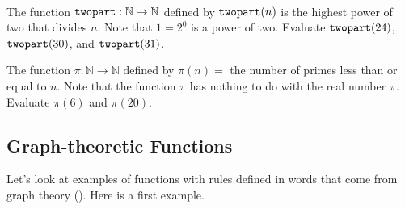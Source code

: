 \begin{act}
\label{act_number_functions} 
~    
    \begin{actpart}  
        \item The function $\texttt{twopart}: \mathbb{N} \to \mathbb{N}$ defined by $\texttt{twopart}(n)$ is the highest power of two that divides $n$. Note that $1 = 2^0$ is a power of two. Evaluate $\texttt{twopart}(24)$, $\texttt{twopart}(30)$, and $\texttt{twopart}(31)$. 
        \item The function $\pi: \mathbb{N} \to \mathbb{N}$ defined by $\pi(n)=$ the number of primes less than or equal to $n$. Note that the function $\pi$ has nothing to do with the real number $\pi$. Evaluate $\pi(6)$ and $\pi(20)$.
        \end{actpart}
\end{act}


\newcommand{\subfngraphs}{Graph-theoretic Functions}
\subsection{\subfngraphs}
\label{sub_graph_functions} 

Let's look at examples of functions with rules defined in words that come from graph theory ().  Here is a first example.

